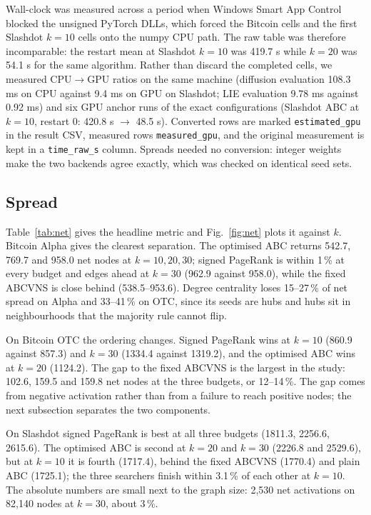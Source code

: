 \documentclass[journal,letterpaper,10pt]{IEEEtran}
\begin{document}
Wall-clock was measured across a period when Windows Smart App Control blocked the unsigned PyTorch DLLs, which forced the Bitcoin cells and the first Slashdot $k=10$ cells onto the numpy CPU path. The raw table was therefore incomparable: the restart mean at Slashdot $k=10$ was 419.7 s while $k=20$ was 54.1 s for the same algorithm. Rather than discard the completed cells, we measured CPU$\to$GPU ratios on the same machine (diffusion evaluation 108.3 ms on CPU against 9.4 ms on GPU on Slashdot; LIE evaluation 9.78 ms against 0.92 ms) and six GPU anchor runs of the exact configurations (Slashdot ABC at $k=10$, restart 0: 420.8 s $\to$ 48.5 s). Converted rows are marked \texttt{estimated\_gpu} in the result CSV, measured rows \texttt{measured\_gpu}, and the original measurement is kept in a \texttt{time\_raw\_s} column. Spreads needed no conversion: integer weights make the two backends agree exactly, which was checked on identical seed sets.

\subsection{Spread}

Table~\ref{tab:net} gives the headline metric and Fig.~\ref{fig:net} plots it against $k$. Bitcoin Alpha gives the clearest separation. The optimised ABC returns 542.7, 769.7 and 958.0 net nodes at $k=10,20,30$; signed PageRank is within 1\,\% at every budget and edges ahead at $k=30$ (962.9 against 958.0), while the fixed ABCVNS is close behind (538.5--953.6). Degree centrality \cite{freeman1978} loses 15--27\,\% of net spread on Alpha and 33--41\,\% on OTC, since its seeds are hubs and hubs sit in neighbourhoods that the majority rule cannot flip.

On Bitcoin OTC the ordering changes. Signed PageRank wins at $k=10$ (860.9 against 857.3) and $k=30$ (1334.4 against 1319.2), and the optimised ABC wins at $k=20$ (1124.2). The gap to the fixed ABCVNS is the largest in the study: 102.6, 159.5 and 159.8 net nodes at the three budgets, or 12--14\,\%. The gap comes from negative activation rather than from a failure to reach positive nodes; the next subsection separates the two components.

On Slashdot signed PageRank is best at all three budgets (1811.3, 2256.6, 2615.6). The optimised ABC is second at $k=20$ and $k=30$ (2226.8 and 2529.6), but at $k=10$ it is fourth (1717.4), behind the fixed ABCVNS (1770.4) and plain ABC (1725.1); the three searchers finish within 3.1\,\% of each other at $k=10$. The absolute numbers are small next to the graph size: 2{,}530 net activations on 82{,}140 nodes at $k=30$, about 3\,\%.
\end{document}
